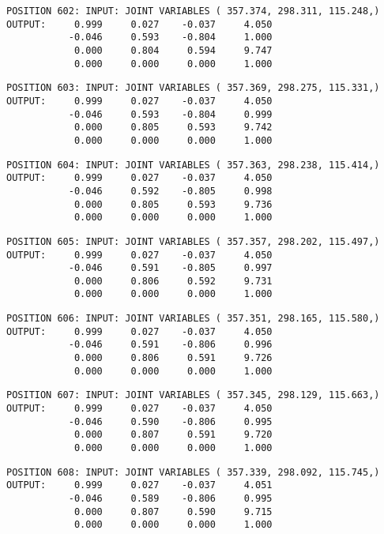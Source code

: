\begin{verbatim}
POSITION 602: INPUT: JOINT VARIABLES ( 357.374, 298.311, 115.248,)
OUTPUT:     0.999     0.027    -0.037     4.050
           -0.046     0.593    -0.804     1.000
            0.000     0.804     0.594     9.747
            0.000     0.000     0.000     1.000
\end{verbatim} \pagebreak[1]\begin{verbatim}
POSITION 603: INPUT: JOINT VARIABLES ( 357.369, 298.275, 115.331,)
OUTPUT:     0.999     0.027    -0.037     4.050
           -0.046     0.593    -0.804     0.999
            0.000     0.805     0.593     9.742
            0.000     0.000     0.000     1.000
\end{verbatim} \pagebreak[1]\begin{verbatim}
POSITION 604: INPUT: JOINT VARIABLES ( 357.363, 298.238, 115.414,)
OUTPUT:     0.999     0.027    -0.037     4.050
           -0.046     0.592    -0.805     0.998
            0.000     0.805     0.593     9.736
            0.000     0.000     0.000     1.000
\end{verbatim} \pagebreak[1]\begin{verbatim}
POSITION 605: INPUT: JOINT VARIABLES ( 357.357, 298.202, 115.497,)
OUTPUT:     0.999     0.027    -0.037     4.050
           -0.046     0.591    -0.805     0.997
            0.000     0.806     0.592     9.731
            0.000     0.000     0.000     1.000
\end{verbatim} \pagebreak[1]\begin{verbatim}
POSITION 606: INPUT: JOINT VARIABLES ( 357.351, 298.165, 115.580,)
OUTPUT:     0.999     0.027    -0.037     4.050
           -0.046     0.591    -0.806     0.996
            0.000     0.806     0.591     9.726
            0.000     0.000     0.000     1.000
\end{verbatim} \pagebreak[1]\begin{verbatim}
POSITION 607: INPUT: JOINT VARIABLES ( 357.345, 298.129, 115.663,)
OUTPUT:     0.999     0.027    -0.037     4.050
           -0.046     0.590    -0.806     0.995
            0.000     0.807     0.591     9.720
            0.000     0.000     0.000     1.000
\end{verbatim} \pagebreak[1]\begin{verbatim}
POSITION 608: INPUT: JOINT VARIABLES ( 357.339, 298.092, 115.745,)
OUTPUT:     0.999     0.027    -0.037     4.051
           -0.046     0.589    -0.806     0.995
            0.000     0.807     0.590     9.715
            0.000     0.000     0.000     1.000
\end{verbatim} \pagebreak[1]\begin{verbatim}

\end{verbatim}
